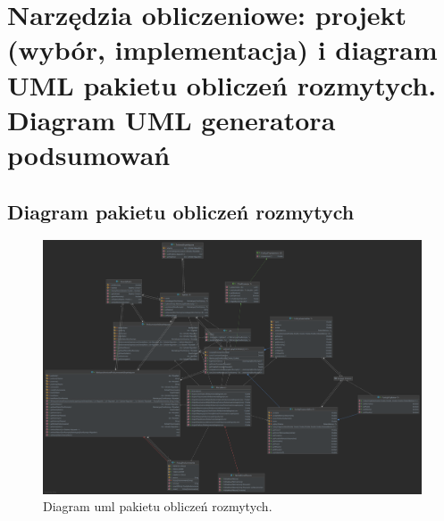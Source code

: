 \documentclass{classrep}
\begin{document}
\section{Narzędzia obliczeniowe: projekt (wybór, implementacja) i diagram UML pakietu obliczeń rozmytych. Diagram UML generatora podsumowań}
\subsection{Diagram pakietu obliczeń rozmytych}

\begin{figure}[h!]
\centering
\includegraphics[width=14cm]{uml.png}
\vspace{-0.3cm}
\caption{Diagram uml pakietu obliczeń rozmytych. }
\label{uml_obliczenia}
\end{figure}
\newpage
\end{document}
